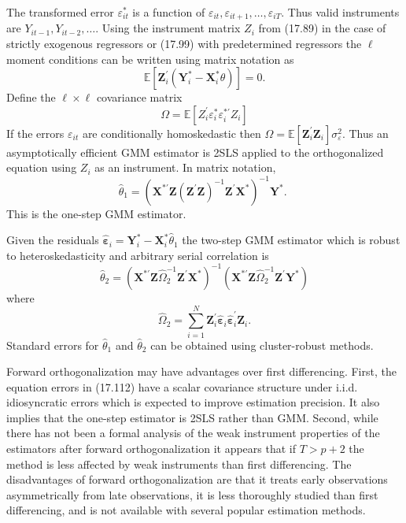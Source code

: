 \documentclass[10pt]{article}
\begin{document}
The transformed error $\varepsilon_{i t}^{*}$ is a function of $\varepsilon_{i t}, \varepsilon_{i t+1}, \ldots, \varepsilon_{i T}$. Thus valid instruments are $Y_{i t-1}, Y_{i t-2}, \ldots$. Using the instrument matrix $Z_{i}$ from (17.89) in the case of strictly exogenous regressors or (17.99) with predetermined regressors the $\ell$ moment conditions can be written using matrix notation as
$$
\mathbb{E}\left[\boldsymbol{Z}_{i}^{\prime}\left(\boldsymbol{Y}_{i}^{*}-\boldsymbol{X}_{i}^{*} \theta\right)\right]=0 .
$$
Define the $\ell \times \ell$ covariance matrix
$$
\Omega=\mathbb{E}\left[Z_{i}^{\prime} \varepsilon_{i}^{*} \varepsilon_{i}^{* \prime} Z_{i}\right]
$$
If the errors $\varepsilon_{i t}$ are conditionally homoskedastic then $\Omega=\mathbb{E}\left[\boldsymbol{Z}_{i}^{\prime} \boldsymbol{Z}_{i}\right] \sigma_{\varepsilon}^{2}$. Thus an asymptotically efficient GMM estimator is 2SLS applied to the orthogonalized equation using $Z_{i}$ as an instrument. In matrix notation,
$$
\widehat{\theta}_{1}=\left(\boldsymbol{X}^{* \prime} \boldsymbol{Z}\left(\boldsymbol{Z}^{\prime} \boldsymbol{Z}\right)^{-1} \boldsymbol{Z}^{\prime} \boldsymbol{X}^{*}\right)^{-1} \boldsymbol{Y}^{*} \text {. }
$$
This is the one-step GMM estimator.

Given the residuals $\widehat{\boldsymbol{\varepsilon}}_{i}=\boldsymbol{Y}_{i}^{*}-\boldsymbol{X}_{i}^{*} \widehat{\theta}_{1}$ the two-step GMM estimator which is robust to heteroskedasticity and arbitrary serial correlation is
$$
\widehat{\theta}_{2}=\left(\boldsymbol{X}^{* \prime} \boldsymbol{Z} \widehat{\Omega}_{2}^{-1} \boldsymbol{Z}^{\prime} \boldsymbol{X}^{*}\right)^{-1}\left(\boldsymbol{X}^{* \prime} \boldsymbol{Z} \widehat{\Omega}_{2}^{-1} \boldsymbol{Z}^{\prime} \boldsymbol{Y}^{*}\right)
$$
where
$$
\widehat{\Omega}_{2}=\sum_{i=1}^{N} \boldsymbol{Z}_{i}^{\prime} \widehat{\boldsymbol{\varepsilon}}_{i} \widehat{\boldsymbol{\varepsilon}}_{i}^{\prime} \boldsymbol{Z}_{i} .
$$
Standard errors for $\widehat{\theta}_{1}$ and $\widehat{\theta}_{2}$ can be obtained using cluster-robust methods.

Forward orthogonalization may have advantages over first differencing. First, the equation errors in (17.112) have a scalar covariance structure under i.i.d. idiosyncratic errors which is expected to improve estimation precision. It also implies that the one-step estimator is 2SLS rather than GMM. Second, while there has not been a formal analysis of the weak instrument properties of the estimators after forward orthogonalization it appears that if $T>p+2$ the method is less affected by weak instruments than first differencing. The disadvantages of forward orthogonalization are that it treats early observations asymmetrically from late observations, it is less thoroughly studied than first differencing, and is not available with several popular estimation methods.
\end{document}
